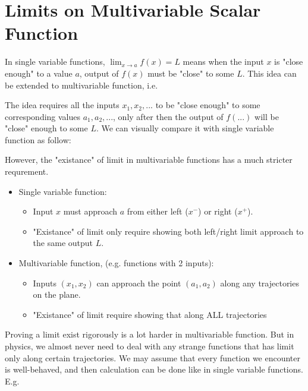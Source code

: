 \documentclass[class=article, crop=false, 12pt]{standalone}
\begin{document}
\linesep
\section{Limits on Multivariable Scalar Function}

In single variable functions, $\lim_{x\to a} f(x) = L$ means 
when the input $x$ is "close enough" to a value $a$, output of $f(x)$ must be "close" to some $L$.
This idea can be extended to multivariable function, i.e.

The idea requires all the inputs $x_1, x_2, ...$ to be "close enough" to some corresponding values $a_1, a_2,...$,
only after then the output of $f(...)$ will be "close" enough to some $L$. 
We can visually compare it with single variable function as follow:


However, the "existance" of limit in multivariable functions has a much stricter requrement.
\begin{itemize}
    \item Single variable function: 
    \begin{itemize}
        \item Input $x$ must approach $a$ from either left ($x^-$) or right ($x^+$).
        \item "Existance" of limit only require showing both left/right limit approach to the same output $L$.
    \end{itemize}
    
    \item Multivariable function, (e.g. functions with 2 inputs):
    \begin{itemize}
        \item Inputs $(x_1, x_2)$ can approach the point $(a_1, a_2)$ along any trajectories on the plane. 
        \item "Existance" of limit require showing that along ALL trajectories
    \end{itemize}
\end{itemize}


 Proving a limit exist rigorously is a lot harder in multivariable function.
 But in physics, we almost never need to deal with any strange functions that has limit only along certain trajectories.
 We may assume that every function we encounter is well-behaved, and then calculation can be done like in single variable functions. E.g.
 
\end{document}
